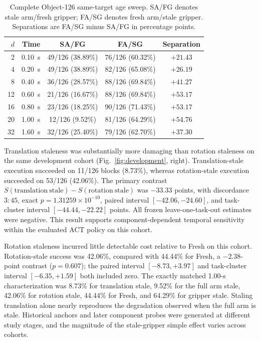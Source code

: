 \begin{table}[t]
\centering
\caption{Complete Object-126 same-target age sweep. SA/FG denotes stale
arm/fresh gripper; FA/SG denotes fresh arm/stale gripper. Separations are
FA/SG minus SA/FG in percentage points.}
\label{tab:r1a-full}
\scriptsize
\setlength{\tabcolsep}{2pt}
\begin{tabular*}{\columnwidth}{@{\extracolsep{\fill}}rrccc}
\toprule
$d$ & Time & SA/FG & FA/SG & Separation \\
\midrule
2  & 0.10~s & 49/126 (38.89\%) & 76/126 (60.32\%) & $+21.43$ \\
4  & 0.20~s & 49/126 (38.89\%) & 82/126 (65.08\%) & $+26.19$ \\
8  & 0.40~s & 36/126 (28.57\%) & 88/126 (69.84\%) & $+41.27$ \\
12 & 0.60~s & 21/126 (16.67\%) & 88/126 (69.84\%) & $+53.17$ \\
16 & 0.80~s & 23/126 (18.25\%) & 90/126 (71.43\%) & $+53.17$ \\
20 & 1.00~s & 12/126 (9.52\%)  & 81/126 (64.29\%) & $+54.76$ \\
32 & 1.60~s & 32/126 (25.40\%) & 79/126 (62.70\%) & $+37.30$ \\
\bottomrule
\end{tabular*}
\end{table}

Translation staleness was substantially more damaging than rotation staleness
on the same development cohort (Fig.~\ref{fig:development}, right).
Translation-stale execution succeeded on 11/126 blocks (8.73\%), whereas
rotation-stale execution succeeded on 53/126 (42.06\%). The primary contrast
$S(\mathrm{translation\ stale})-S(\mathrm{rotation\ stale})$ was $-33.33$
points, with discordance $3{:}45$, exact $p=1.31259\times10^{-10}$, paired
interval $[-42.06,-24.60]$, and task-cluster interval
$[-44.44,-22.22]$ points. All frozen leave-one-task-out estimates were
negative. This result supports component-dependent temporal sensitivity within
the evaluated ACT policy on this cohort.

Rotation staleness incurred little detectable cost relative to Fresh on this
cohort. Rotation-stale success was 42.06\%, compared with 44.44\% for Fresh,
a $-2.38$-point contrast ($p=0.607$); the paired interval
$[-8.73,+3.97]$ and task-cluster interval $[-6.35,+1.59]$ both included zero.
The exactly matched 1.00-s characterization was 8.73\% for translation stale,
9.52\% for the full arm stale, 42.06\% for rotation stale, 44.44\% for Fresh,
and 64.29\% for gripper stale. Staling translation alone nearly reproduces the
degradation observed when the full arm is stale. Historical anchors and later
component probes were generated at different study stages, and the magnitude
of the stale-gripper simple effect varies across cohorts.

